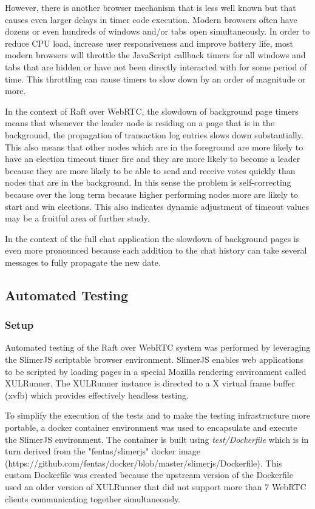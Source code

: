 \documentclass[9pt]{extarticle}
\begin{document}
\begin{multicols}{2}
However, there is another browser mechanism that is less well known
but that causes even larger delays in timer code execution. Modern
browsers often have dozens or even hundreds of windows and/or tabs
open simultaneously. In order to reduce CPU load, increase user
responsiveness and improve battery life, most modern browsers will
throttle the JavaScript callback timers for all windows and tabs that
are hidden or have not been directly interacted with for some period
of time. This throttling can cause timers to slow down by an order of
magnitude or more.

In the context of Raft over WebRTC, the slowdown of background page
timers means that whenever the leader node is residing on a page that
is in the background, the propagation of transaction log entries slows
down substantially. This also means that other nodes which are in the
foreground are more likely to have an election timeout timer fire and
they are more likely to become a leader because they are more likely
to be able to send and receive votes quickly than nodes that are in
the background. In this sense the problem is self-correcting because
over the long term because higher performing nodes more are likely to
start and win elections. This also indicates dynamic adjustment of
timeout values may be a fruitful area of further study.

In the context of the full chat application the slowdown of background
pages is even more pronounced because each addition to the chat
history can take several messages to fully propagate the new date.


\subsection{Automated Testing}

\subsubsection{Setup}

Automated testing of the Raft over WebRTC system was performed by
leveraging the SlimerJS scriptable browser environment. SlimerJS
enables web applications to be scripted by loading pages in a special
Mozilla rendering environment called XULRunner. The XULRunner instance
is directed to a X virtual frame buffer (xvfb) which provides
effectively headless testing.

To simplify the execution of the tests and to make the testing
infrastructure more portable, a docker container environment was used
to encapsulate and execute the SlimerJS environment. The container is
built using \emph{test/Dockerfile} which is in turn derived from
the "fentas/slimerjs" docker image
(https://github.com/fentas/docker/blob/master/slimerjs/Dockerfile).
This custom Dockerfile was created because the upstream version of the
Dockerfile used an older version of XULRunner that did not support
more than 7 WebRTC clients communicating together simultaneously.


\end{multicols}
\end{document}
